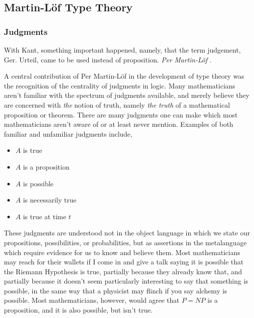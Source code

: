 \subsection{Martin-Löf Type Theory}
\subsubsection{Judgments}

\begin{displayquote}
With Kant, something important happened, namely, that the term judgement, Ger.
Urteil, came to be used instead of proposition. \emph{Per Martin-Löf} \cite{mlMeanings}.
\end{displayquote}

A central contribution of Per Martin-Löf in the development of type theory was
the recognition of the centrality of judgments in logic. Many mathematicians
aren't familiar with the spectrum of judgments available, and merely believe
they are concerned with \emph{the} notion of truth, namely \emph{the truth} of a
mathematical proposition or theorem. There are many judgments one can make which
most mathematicians aren't aware of or at least never mention. Examples of both familiar
and unfamiliar judgments include,

\begin{itemize}

\item $A$ is true
\item $A$ is a proposition
\item $A$ is possible
\item $A$ is necessarily true
\item $A$ is true at time $t$

\end{itemize}

These judgments are understood not in the object language in which we state our
propositions, possibilities, or probabilities, but as assertions in the
metalanguage which require evidence for us to know and believe them. Most
mathematicians may reach for their wallets if I come in and give a talk saying
it is possible that the Riemann Hypothesis is true, partially because they
already know that, and partially because it doesn't seem particularly
interesting to say that something is possible, in the same way that a physicist
may flinch if you say alchemy is possible. Most mathematicians, however, would
agree that $P = NP$ is a proposition, and it is also possible, but isn't true.

